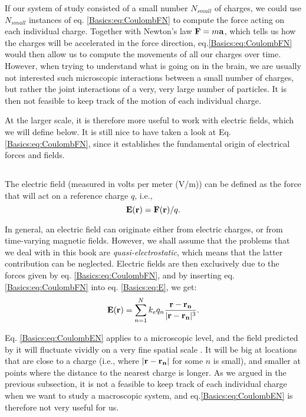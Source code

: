 If our system of study consisted of a small number $N_{small}$ of charges, we could use $N_{small}$ instances of eq. \ref{Basics:eq:CoulombFN} to compute the force acting on each individual charge. Together with Newton's law ${\bf F} = m {\bf a}$, which tells us how the charges will be accelerated in the force direction, eq.\ref{Basics:eq:CoulombFN} would then allow us to compute the movements of all our charges over time. However, when trying to understand what is going on in the brain, we are usually not interested such microscopic interactions between a small number of charges, but rather the joint interactions of a very, very large number of particles. It is then not feasible to keep track of the motion of each individual charge. 

At the larger scale, it is therefore more useful to work with electric fields, which we will define below. It is still nice to have taken a look at  Eq. \ref{Basics:eq:CoulombFN}, since it establishes the fundamental origin of electrical forces and fields. 


\subsection{}
The electric field (measured in volts per meter (V/m)) can be defined as the force that will act on a reference charge $q$, i.e., 
\begin{equation}
{\bf E}({\bf r}) = {\bf F}({\bf r})/q.
\label{Basics:eq:E}
\end{equation}

In general, an electric field can originate either from electric charges, or from time-varying magnetic fields. However, we shall assume that the problems that we deal with in this book are \textit{quasi-electrostatic}, which means that the latter contribution can be neglected. 
Electric fields are then exclusively due to the forces given by eq. \ref{Basics:eq:CoulombFN}, and by inserting eq. \ref{Basics:eq:CoulombFN} into eq. \ref{Basics:eq:E}, we get:
\begin{equation}
{\bf E}({\bf r}) = \sum_{n=1}^N k_e q_n \frac{{\bf r}-{\bf r_n}}{|{\bf r}-{\bf r_n}|^3}.
\label{Basics:eq:CoulombEN}
\end{equation}

Eq. \ref{Basics:eq:CoulombEN} applies to a microscopic level, and the field predicted by it will fluctuate vividly on a very fine spatial scale . It will be big at locations that are close to a charge (i.e., where $|{\bf r}-{\bf r_n}|$ for some $n$ is small), and smaller at points where the distance to the nearest charge is longer. As we argued in the previous subsection, it is not a feasible to keep track of each individual charge when we want to study a macroscopic system, and eq.\ref{Basics:eq:CoulombEN} is therefore not very useful for us.

